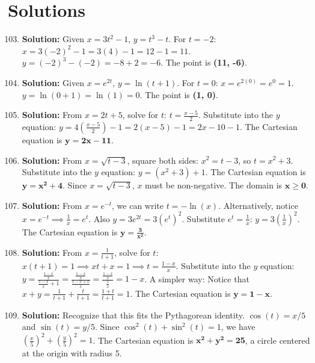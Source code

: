 \documentclass{article}
\begin{document}
\section*{Solutions}
\begin{enumerate}
    \setcounter{enumi}{102}
\item \textbf{Solution:} Given $x = 3t^2 - 1$, $y = t^3 - t$. For $t = -2$:
$x = 3(-2)^2 - 1 = 3(4) - 1 = 12 - 1 = 11$.
$y = (-2)^3 - (-2) = -8 + 2 = -6$.
The point is \textbf{(11, -6)}.

\item \textbf{Solution:} Given $x = e^{2t}$, $y = \ln(t+1)$. For $t = 0$:
$x = e^{2(0)} = e^0 = 1$.
$y = \ln(0+1) = \ln(1) = 0$.
The point is \textbf{(1, 0)}.

\item \textbf{Solution:} From $x = 2t + 5$, solve for $t$: $t = \frac{x-5}{2}$.
Substitute into the $y$ equation: $y = 4\left(\frac{x-5}{2}\right) - 1 = 2(x-5) - 1 = 2x - 10 - 1$.
The Cartesian equation is $\mathbf{y = 2x - 11}$.

\item \textbf{Solution:} From $x = \sqrt{t-3}$, square both sides: $x^2 = t-3$, so $t = x^2+3$.
Substitute into the $y$ equation: $y = (x^2+3)+1$.
The Cartesian equation is $\mathbf{y = x^2+4}$.
Since $x = \sqrt{t-3}$, $x$ must be non-negative. The domain is $\mathbf{x \ge 0}$.

\item \textbf{Solution:} From $x = e^{-t}$, we can write $t = -\ln(x)$.
Alternatively, notice $x = e^{-t} \implies \frac{1}{x} = e^t$.
Also $y = 3e^{2t} = 3(e^t)^2$.
Substitute $e^t = \frac{1}{x}$: $y = 3\left(\frac{1}{x}\right)^2$.
The Cartesian equation is $\mathbf{y = \frac{3}{x^2}}$.

\item \textbf{Solution:} From $x = \frac{1}{t+1}$, solve for $t$: $x(t+1) = 1 \implies xt + x = 1 \implies t = \frac{1-x}{x}$.
Substitute into the $y$ equation: $y = \frac{\frac{1-x}{x}}{\frac{1-x}{x}+1} = \frac{\frac{1-x}{x}}{\frac{1-x+x}{x}} = \frac{\frac{1-x}{x}}{\frac{1}{x}} = 1-x$.
A simpler way: Notice that $x+y = \frac{1}{t+1} + \frac{t}{t+1} = \frac{1+t}{t+1} = 1$.
The Cartesian equation is $\mathbf{y = 1-x}$.

\item \textbf{Solution:} Recognize that this fits the Pythagorean identity.
$\cos(t) = x/5$ and $\sin(t) = y/5$.
Since $\cos^2(t) + \sin^2(t) = 1$, we have $(\frac{x}{5})^2 + (\frac{y}{5})^2 = 1$.
The Cartesian equation is $\mathbf{x^2 + y^2 = 25}$, a circle centered at the origin with radius 5.


\end{enumerate}
\end{document}
